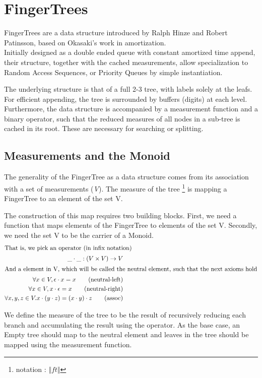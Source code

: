 \documentclass[12pt,twoside,notitlepage]{report}
\begin{document}
\section{FingerTrees} 

	FingerTrees are a data structure introduced by Ralph Hinze and Robert Patinsson, based on Okasaki's work in amortization.\\
Initially designed as a double ended queue with constant amortized time append, their structure, together with the cached measurements, allow specialization to Random Access Sequences, or Priority Queues by simple instantiation.  
 
 	The underlying structure is that of a full 2-3 tree, with labels solely at the leafs. For efficient appending, the tree is surrounded by buffers (digits) at each level. Furthermore, the data structure is accompanied by a measurement function and a binary operator, such that the reduced measures of all nodes in a sub-tree is cached in its root. These are necessary for searching or splitting.

\subsection{Measurements and the Monoid}
\label{sec:measure}
The generality of the FingerTree as a data structure comes from its association with a set of measurements (\textit{V}). The measure of the tree \footnote{notation : $\Vert ft \Vert$} is mapping a FingerTree to an element of the set V.

The construction of this map requires two building blocks. First, we need a function that maps elements of the FingerTree to elements of the set V. Secondly, we need the set V to be the carrier of a Monoid.
\begin{align*}
\intertext{That is, we pick an operator (in infix notation)} 
	\_\cdot\_ : (V \times V) \to V \\ 
\intertext{And a element in V, which will be called the neutral element, such that the next axioms hold} 
	\forall	x \in V, \epsilon \cdot x = x  \tag{neutral-left}\\
	\forall x \in V, x \cdot \epsilon = x  \tag{neutral-right} \\
	\forall x, y,z \in V. x \cdot (y \cdot z) = (x \cdot y) \cdot z \tag{assoc} 
\end{align*}

We define the measure of the tree to be the result of recursively reducing each branch and accumulating the result using the operator. As the base case, an Empty tree should map to the neutral element and leaves in the tree should be mapped using the measurement function.
\end{document}
